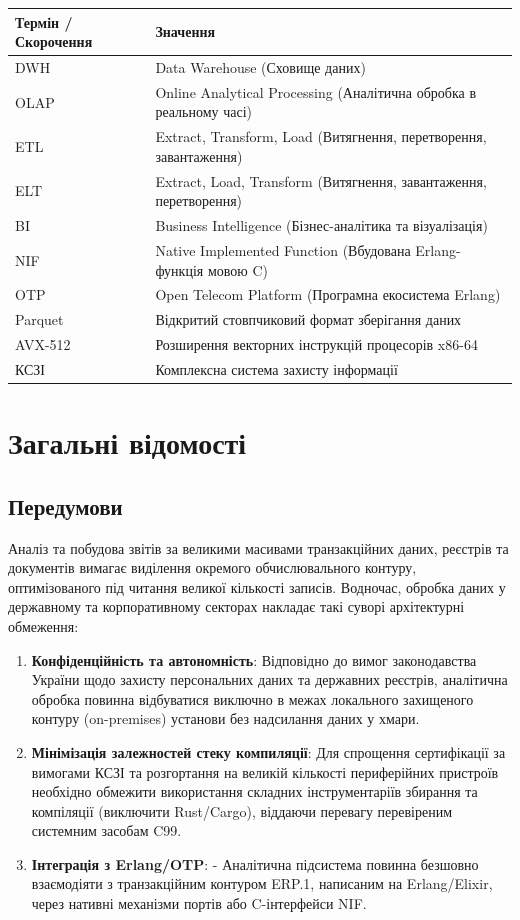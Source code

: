 \documentclass{article}
\begin{document}
\begin{longtable}{p{4cm}p{10cm}}
\toprule
\textbf{Термін / Скорочення} & \textbf{Значення} \\
\midrule
DWH & Data Warehouse (Сховище даних) \\
OLAP & Online Analytical Processing (Аналітична обробка в реальному часі) \\
ETL & Extract, Transform, Load (Витягнення, перетворення, завантаження) \\
ELT & Extract, Load, Transform (Витягнення, завантаження, перетворення) \\
BI & Business Intelligence (Бізнес-аналітика та візуалізація) \\
NIF & Native Implemented Function (Вбудована Erlang-функція мовою C) \\
OTP & Open Telecom Platform (Програмна екосистема Erlang) \\
Parquet & Відкритий стовпчиковий формат зберігання даних \\
AVX-512 & Розширення векторних інструкцій процесорів x86-64 \\
КСЗІ & Комплексна система захисту інформації \\
\bottomrule
\end{longtable}

\newpage
\section{Загальні відомості}

\subsection{Передумови}
Аналіз та побудова звітів за великими масивами транзакційних даних, реєстрів та документів вимагає виділення окремого обчислювального контуру, оптимізованого під читання великої кількості записів. Водночас, обробка даних у державному та корпоративному секторах накладає такі суворі архітектурні обмеження:
\begin{enumerate}
    \item \textbf{Конфіденційність та автономність}: Відповідно до вимог законодавства України щодо захисту персональних даних та державних реєстрів, аналітична обробка повинна відбуватися виключно в межах локального захищеного контуру (on-premises) установи без надсилання даних у хмари.
    \item \textbf{Мінімізація залежностей стеку компиляції}: Для спрощення сертифікації за вимогами КСЗІ та розгортання на великій кількості периферійних пристроїв необхідно обмежити використання складних інструментаріїв збирання та компіляції (виключити Rust/Cargo), віддаючи перевагу перевіреним системним засобам C99.
    \item \textbf{Інтеграція з Erlang/OTP}: - Аналітична підсистема повинна безшовно взаємодіяти з транзакційним контуром ERP.1, написаним на Erlang/Elixir, через нативні механізми портів або C-інтерфейси NIF.
\end{enumerate}
\end{document}
